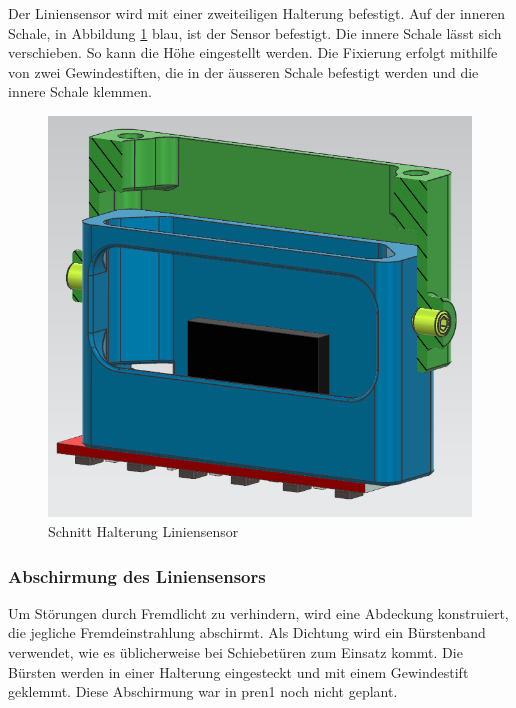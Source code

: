 Der Liniensensor wird mit einer zweiteiligen Halterung befestigt. Auf der inneren Schale, in Abbildung \ref{fig:Schnitt Halterung Liniensensor} blau, ist der Sensor befestigt. Die innere Schale lässt sich verschieben. So kann die Höhe eingestellt werden. Die Fixierung erfolgt mithilfe von zwei Gewindestiften, die in der äusseren Schale befestigt werden und die innere Schale klemmen. 


\begin{figure}[H]
    \centering
    \includegraphics[width=0.75\linewidth]{assets//MT/Sensor Halterung.png}
    \caption{Schnitt Halterung Liniensensor}
    \label{fig:Schnitt Halterung Liniensensor}
\end{figure}


\subsubsection{Abschirmung des Liniensensors}
\label{Abschirmung des Liniensensors}

Um Störungen durch Fremdlicht zu verhindern, wird eine Abdeckung konstruiert, die jegliche Fremdeinstrahlung abschirmt. Als Dichtung wird ein Bürstenband verwendet, wie es üblicherweise bei Schiebetüren zum Einsatz kommt. Die Bürsten werden in einer Halterung eingesteckt und mit einem Gewindestift geklemmt.  Diese Abschirmung war in \acrshort{pren1} noch nicht geplant.


\begin{figure}[H]
 
\end{figure}
\newpage

